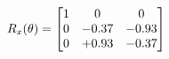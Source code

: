 \documentclass[preview]{standalone}
\begin{document}
\begin{align*}
\special{dvisvgm:raw <g id='unique000'>}R_{x}(\theta) = \begin{bmatrix}1 & 0 & 0 \\0 & -0.37 & -0.93 \\0 & +0.93 & -0.37\end{bmatrix}\special{dvisvgm:raw </g>}
\end{align*}
\end{document}
